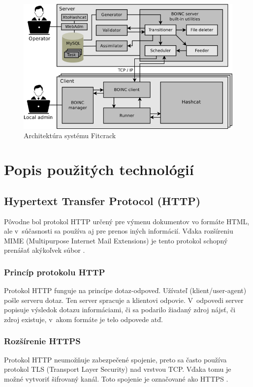 \documentclass[slovak,cprint]{fitthesis} %
\begin{document}
\begin{figure}[h]
    \centering
    \includegraphics[scale=0.5]{obrazky/fitcrack_arch_web.png}
    \caption{Architektúra systému Fitcrack \cite{fitcrackSprava}}
    \label{fig:archFitcrack}
\end{figure}



\chapter{Popis použitých technológií}\label{technologie}


\section{Hypertext Transfer Protocol (HTTP)}\label{http}
Pôvodne bol protokol HTTP určený pre výmenu dokumentov vo formáte HTML, ale v~súčasnosti sa používa aj pre prenos iných informácií. Vďaka rozšíreniu MIME (Multipurpose Internet Mail Extensions) je tento protokol schopný prenášať akýkoľvek súbor \cite{httpRFC}.

\subsection{Princíp protokolu HTTP}
Protokol HTTP funguje na princípe dotaz-odpoveď. Užívateľ (klient/user-agent) pošle serveru dotaz. Ten server spracuje a klientovi odpovie. V~odpovedi server popisuje výsledok dotazu informáciami, či sa podarilo žiadaný zdroj nájsť, či zdroj existuje, v~akom formáte je telo odpovede atď.


\subsection{Rozšírenie HTTPS}
Protokol HTTP neumožňuje zabezpečené spojenie, preto sa často používa protokol TLS (Transport Layer Security) nad vrstvou TCP. Vďaka tomu je možné vytvoriť šifrovaný kanál. Toto spojenie je označované ako HTTPS \cite{httpsRFC}.
\end{document}
